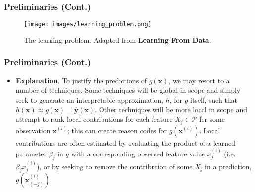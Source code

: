 
\begin{frame}\frametitle{Preliminaries (Cont.)}
	\begin{figure}[htb]
	\begin{center}
		\texttt{[image: images/learning\_problem.png]}
		\caption{The learning problem. Adapted from \textbf{Learning From Data}.}
		\label{fig:learning_problem}
	\end{center}
	\end{figure}
\end{frame}


\begin{frame}\frametitle{Preliminaries (Cont.)}
	\begin{itemize}
		\item \textbf{Explanation}. To justify the predictions of $g(\mathbf{x})$, we may resort to a number of techniques. Some techniques will be global in scope and simply seek to generate an interpretable approximation, $h$, for $g$ itself, such that $h(\mathbf{x}) \approx g(\mathbf{x}) = \hat{\mathbf{y}}(\mathbf{x})$. Other techniques will be more local in scope and attempt to rank local contributions for each feature $X_j \in \mathcal{P}$ for some observation $\mathbf{x}^{(i)}$; this can create reason codes for $g(\mathbf{x}^{(i)})$. Local contributions are often estimated by evaluating the product of a learned parameter $\beta_j$ in $g$ with a corresponding observed feature value $x_j^{(i)}$ (i.e. $\beta_jx_j^{(i)}$), or by seeking to remove the contribution of some $X_j$ in a prediction, $g(\mathbf{x}_{(-j)}^{(i)})$.
	\end{itemize}
\end{frame}




